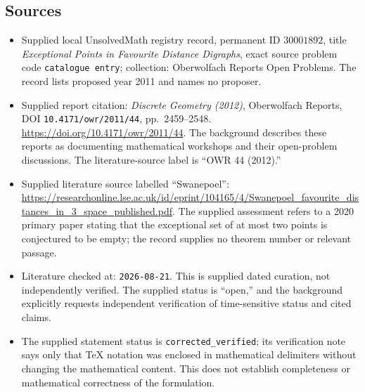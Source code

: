 \documentclass[11pt]{article}
\begin{document}
\subsection{Sources}
\begin{itemize}
\item Supplied local UnsolvedMath registry record, permanent ID \(30001892\), title \emph{Exceptional Points in Favourite Distance Digraphs}, exact source problem code \texttt{catalogue entry}; collection: Oberwolfach Reports Open Problems. The record lists proposed year 2011 and names no proposer.
\item Supplied report citation: \emph{Discrete Geometry (2012)}, Oberwolfach Reports, DOI \texttt{10.4171/owr/2011/44}, pp.\ 2459--2548. \url{https://doi.org/10.4171/owr/2011/44}. The background describes these reports as documenting mathematical workshops and their open-problem discussions. The literature-source label is ``OWR 44 (2012).''
\item Supplied literature source labelled ``Swanepoel'': \url{https://researchonline.lse.ac.uk/id/eprint/104165/4/Swanepoel_favourite_distances_in_3_space_published.pdf}. The supplied assessment refers to a 2020 primary paper stating that the exceptional set of at most two points is conjectured to be empty; the record supplies no theorem number or relevant passage.
\item Literature checked at: \texttt{2026-08-21}. This is supplied dated curation, not independently verified. The supplied status is ``open,'' and the background explicitly requests independent verification of time-sensitive status and cited claims.
\item The supplied statement status is \texttt{corrected\_verified}; its verification note says only that TeX notation was enclosed in mathematical delimiters without changing the mathematical content. This does not establish completeness or mathematical correctness of the formulation.
\end{itemize}
\end{document}
